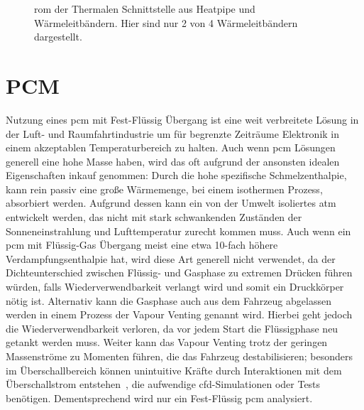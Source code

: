 \begin{figure}
  \caption{\ac{rom} der Thermalen Schnittstelle aus Heatpipe und Wärmeleitbändern. Hier sind nur 2 von 4 Wärmeleitbändern dargestellt.}\label{fig:thermale_schnittstelle}
\end{figure}

\section{PCM}\label{sec:pcm}

Nutzung eines \ac{pcm} mit Fest-Flüssig Übergang ist eine weit verbreitete Lösung in der Luft- und Raumfahrtindustrie um für begrenzte Zeiträume Elektronik in einem akzeptablen
Temperaturbereich zu halten. Auch wenn \ac{pcm} Lösungen generell eine hohe Masse haben, wird das oft aufgrund der ansonsten idealen Eigenschaften inkauf genommen:
Durch die hohe spezifische Schmelzenthalpie, kann rein passiv eine große Wärmemenge, bei einem isothermen Prozess, absorbiert werden. Aufgrund dessen
kann ein von der Umwelt isoliertes \ac{atm} entwickelt werden, das nicht mit stark schwankenden Zuständen der Sonneneinstrahlung und Lufttemperatur
zurecht kommen muss. Auch wenn ein \ac{pcm} mit Flüssig-Gas Übergang meist eine etwa 10-fach höhere Verdampfungsenthalpie hat, wird diese Art
generell nicht verwendet, da der Dichteunterschied zwischen Flüssig- und Gasphase zu extremen Drücken führen würden, falls Wiederverwendbarkeit
verlangt wird und somit ein Druckkörper nötig ist. Alternativ kann die Gasphase auch aus dem Fahrzeug abgelassen werden in einem Prozess der
Vapour Venting genannt wird. Hierbei geht jedoch die Wiederverwendbarkeit verloren, da vor jedem Start die Flüssigphase neu getankt werden muss.
Weiter kann das Vapour Venting trotz der geringen Massenströme zu Momenten führen, die das Fahrzeug destabilisieren; besonders im Überschallbereich
können unintuitive Kräfte durch Interaktionen mit dem Überschallstrom entstehen~\cite{Deere-2011}, die aufwendige \ac{cfd}-Simulationen oder Tests benötigen.
Dementsprechend wird nur ein Fest-Flüssig \ac{pcm} analysiert.

